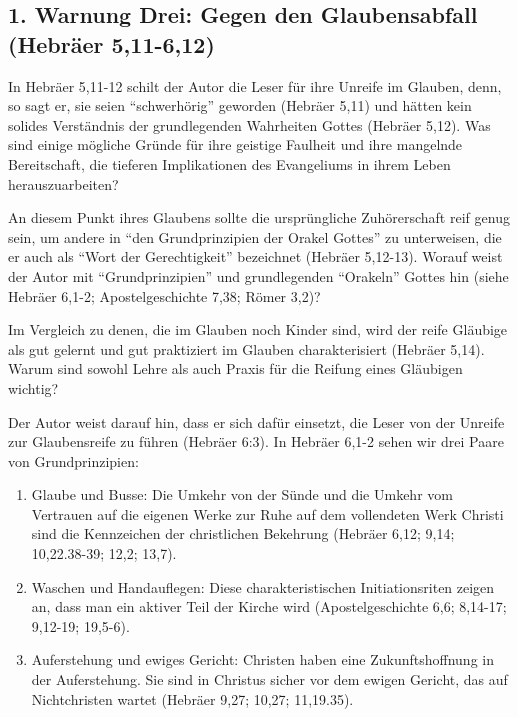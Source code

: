 \documentclass[]{krantz}
\providecommand{\tightlist}{%
  \setlength{\itemsep}{0pt}\setlength{\parskip}{0pt}}
\begin{document}
\subsection{1. Warnung Drei: Gegen den Glaubensabfall (Hebräer
5,11-6,12)}\label{warnung-drei-gegen-den-glaubensabfall-hebruxe4er-511-612}

In Hebräer 5,11-12 schilt der Autor die Leser für ihre Unreife im
Glauben, denn, so sagt er, sie seien ``schwerhörig'' geworden (Hebräer
5,11) und hätten kein solides Verständnis der grundlegenden Wahrheiten
Gottes (Hebräer 5,12). Was sind einige mögliche Gründe für ihre geistige
Faulheit und ihre mangelnde Bereitschaft, die tieferen Implikationen des
Evangeliums in ihrem Leben herauszuarbeiten?

An diesem Punkt ihres Glaubens sollte die ursprüngliche Zuhörerschaft
reif genug sein, um andere in ``den Grundprinzipien der Orakel Gottes''
zu unterweisen, die er auch als ``Wort der Gerechtigkeit'' bezeichnet
(Hebräer 5,12-13). Worauf weist der Autor mit ``Grundprinzipien'' und
grundlegenden ``Orakeln'' Gottes hin (siehe Hebräer 6,1-2;
Apostelgeschichte 7,38; Römer 3,2)?

Im Vergleich zu denen, die im Glauben noch Kinder sind, wird der reife
Gläubige als gut gelernt und gut praktiziert im Glauben charakterisiert
(Hebräer 5,14). Warum sind sowohl Lehre als auch Praxis für die Reifung
eines Gläubigen wichtig?

Der Autor weist darauf hin, dass er sich dafür einsetzt, die Leser von
der Unreife zur Glaubensreife zu führen (Hebräer 6:3). In Hebräer 6,1-2
sehen wir drei Paare von Grundprinzipien:

\begin{enumerate}
\def\labelenumi{\arabic{enumi}.}
\tightlist
\item
  Glaube und Busse: Die Umkehr von der Sünde und die Umkehr vom
  Vertrauen auf die eigenen Werke zur Ruhe auf dem vollendeten Werk
  Christi sind die Kennzeichen der christlichen Bekehrung (Hebräer 6,12;
  9,14; 10,22.38-39; 12,2; 13,7).
\item
  Waschen und Handauflegen: Diese charakteristischen Initiationsriten
  zeigen an, dass man ein aktiver Teil der Kirche wird
  (Apostelgeschichte 6,6; 8,14-17; 9,12-19; 19,5-6).
\item
  Auferstehung und ewiges Gericht: Christen haben eine Zukunftshoffnung
  in der Auferstehung. Sie sind in Christus sicher vor dem ewigen
  Gericht, das auf Nichtchristen wartet (Hebräer 9,27; 10,27; 11,19.35).
\end{enumerate}
\end{document}
